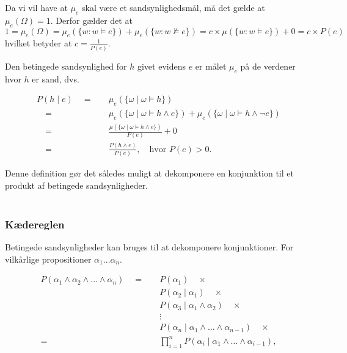 Da vi vil have at $\mu_e$ skal være et sandsynlighedsmål, må det gælde at $\mu_e(\Omega) = 1$.
Derfor gælder det at $1 = \mu_e(\Omega) = \mu_e(\{ w : w \models e \}) + \mu_e(\{ w : w \not\models e \}) = c \times \mu(\{ w : w \models e\}) + 0 = c \times P(e)$
hvilket betyder at $c = \frac{1}{P(e)}$.

Den betingede sandsynlighed for $h$ givet evidens $e$ er målet $\mu_e$ på de verdener hvor $h$ er sand, dvs.

\begin{equation}
\begin{split}
P(h \mid e) \quad = \quad & \mu_e(\{\omega \mid \omega \models h \})\\
\quad = \quad & \mu_e(\{\omega \mid \omega \models h \wedge e \}) + \mu_e(\{\omega \mid \omega \models h \wedge \neg e \})\\
\quad = \quad & \frac{\mu(\{\omega \mid \omega \models h \wedge e \})}{P(e)} + 0\\
\quad = \quad & \frac{P(h \wedge e)}{P(e)}, \quad \textrm{hvor $P(e) > 0$.}
\end{split}
\end{equation}

Denne definition gør det således muligt at dekomponere en konjunktion til et produkt af betingede sandsynligheder. \\ \\
\cite[s. 226-227]{ArtificialIntelligence}

\subsubsection{Kædereglen}

Betingede sandsynligheder kan bruges til at dekomponere konjunktioner.
For vilkårlige propositioner $\alpha_1 \ldots \alpha_n$.

\begin{equation}
\begin{split}
P(\alpha_1 \wedge \alpha_2 \wedge \ldots \wedge \alpha_n) \quad = \quad & P(\alpha_1) \quad \times\\
& P(\alpha_2 \mid \alpha_1) \quad \times\\
& P(\alpha_3 \mid \alpha_1 \wedge \alpha_2) \quad \times\\
& \vdots \\
& P(\alpha_n \mid \alpha_1 \wedge \dots \wedge \alpha_{n-1}) \quad \times\\
= \quad &\prod_{i = 1}^{n} P(\alpha_i \mid \alpha_1 \wedge \dots \wedge \alpha_{i-1}),
\end{split}
\end{equation}

